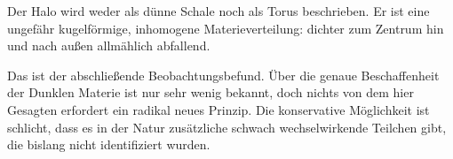 Der Halo wird weder als dünne Schale noch als Torus beschrieben. Er ist eine ungefähr kugelförmige, inhomogene Materieverteilung: dichter zum Zentrum hin und nach außen allmählich abfallend.

\begin{classroomqa}\end{classroomqa}

Das ist der abschließende Beobachtungsbefund. Über die genaue Beschaffenheit der Dunklen Materie ist nur sehr wenig bekannt, doch nichts von dem hier Gesagten erfordert ein radikal neues Prinzip. Die konservative Möglichkeit ist schlicht, dass es in der Natur zusätzliche schwach wechselwirkende Teilchen gibt, die bislang nicht identifiziert wurden.
